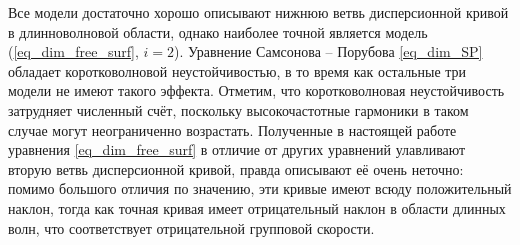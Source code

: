 \documentclass[12pt, a4paper]{report}
\begin{document}
Все модели достаточно хорошо описывают нижнюю ветвь дисперсионной кривой в длинноволновой области, однако наиболее точной является модель (\ref{eq_dim_free_surf}, $i=2$). Уравнение Самсонова -- Порубова \eqref{eq_dim_SP} обладает коротковолновой неустойчивостью, в то время как остальные три модели не имеют такого эффекта. Отметим, что коротковолновая неустойчивость затрудняет численный счёт, поскольку высокочастотные гармоники в таком случае могут неограниченно возрастать. Полученные в настоящей работе уравнения \eqref{eq_dim_free_surf} в отличие от других уравнений улавливают вторую ветвь дисперсионной кривой, правда описывают её очень неточно: помимо большого отличия по значению, эти кривые имеют всюду положительный наклон, тогда как точная кривая имеет отрицательный наклон в области длинных волн, что соответствует отрицательной групповой скорости.

\end{document}
